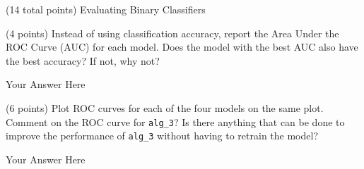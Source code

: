 \documentclass[12pt]{article}
\begin{document}
\begin{question}{(14 total points) Evaluating Binary Classifiers}
\begin{subquestion}
\end{subquestion}



%
%
\begin{subquestion}{(4 points) Instead of using classification accuracy, report the Area Under the ROC Curve (AUC) for each model. 
Does the model with the best AUC also have the best accuracy? If not, why not?\\
}


\begin{answerbox}{15em}
Your Answer Here
\end{answerbox}



\end{subquestion}



%
%
\begin{subquestion}{(6 points) Plot ROC curves for each of the four models on the same plot.
Comment on the ROC curve for \texttt{alg\_3}?
Is there anything that can be done to improve the performance of \texttt{alg\_3} without having to retrain the model?\\
}


\begin{answerbox}{35em}
Your Answer Here
\end{answerbox}



\end{subquestion}

\end{question}
\end{document}
